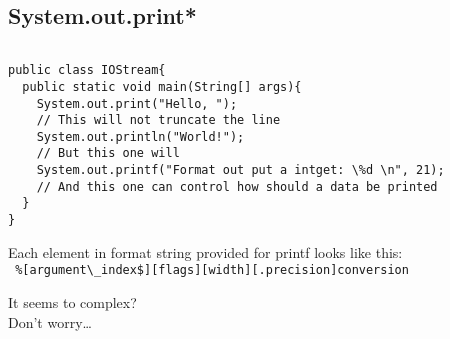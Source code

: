 \documentclass[en, 11pt, xcolor=dvipsnames]{beamer}
\begin{document}
\subsection{System.out.print*}
\begin{frame}[fragile]


	\begin{columns}[c]
		\begin{column}{0.9\textwidth}

			\begin{lstlisting}[style=Java]
public class IOStream{
  public static void main(String[] args){
    System.out.print("Hello, ");
    // This will not truncate the line
    System.out.println("World!");
    // But this one will
    System.out.printf("Format out put a intget: \%d \n", 21);
    // And this one can control how should a data be printed
  }
}\end{lstlisting}

			Each element in format string provided for printf looks like this:\\

			{\verb- %[argument\_index$][flags][width][.precision]conversion -}

			It seems to complex?\\

			Don't worry\dots


		\end{column}
	\end{columns}

\end{frame}
\end{document}
